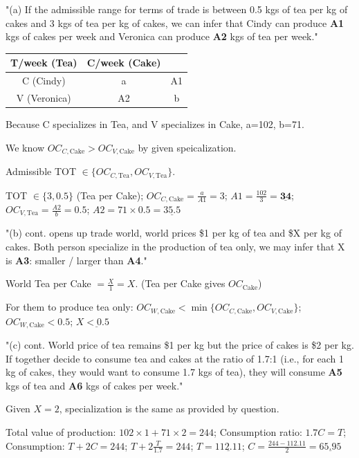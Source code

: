 \documentclass[a4paper]{article}
\begin{document}
\begin{multicols*}{3}
    "(a) If the admissible range for terms of trade is between 0.5 kgs of tea per kg of cakes and 3 kgs of tea per kg of cakes, we can infer that Cindy can produce \textbf{A1} kgs of cakes per week and Veronica can produce \textbf{A2} kgs of tea per week."

    \begin{tabular}{|c|c|c|}
        \hline
        T/week (Tea) & C/week (Cake) &    \\ \hline
        C (Cindy)    & a             & A1 \\ \hline
        V (Veronica) & A2            & b  \\ \hline
    \end{tabular}

    Because C specializes in Tea, and V specializes in Cake, a=102, b=71.

    We know $OC_{C,\text{Cake}} > OC_{V,\text{Cake}}$ by given speicalization.

    Admissible TOT $\in \{OC_{C,\text{Tea}}, OC_{V,\text{Tea}}\}$.

    TOT $\in \{3, 0.5\}$ (Tea per Cake); $OC_{C,\text{Cake}} = \frac{a}{A1} = 3$; $A1 = \frac{102}{3} = \underline{\mathbf{34}}$; $OC_{V,\text{Tea}} = \frac{A2}{b} = 0.5$; $A2 = 71\times0.5 = \underline{\mathbf{35.5}}$

    "(b) cont. opens up trade world, world prices \$1 per kg of tea and \$X per kg of cakes. Both person specialize in the production of tea only, we may infer that X is \textbf{A3}: smaller / larger than \textbf{A4}."

    World Tea per Cake $= \frac{X}{1} = X$. (Tea per Cake gives $OC_\text{Cake}$)

    For them to produce tea only: $OC_{W,\text{Cake}} <\min\{OC_{C,\text{Cake}}, OC_{V,\text{Cake}}\}$; $OC_{W,\text{Cake}} <0.5$; $X \underline{\mathbf{<0.5}}$

    "(c) cont. World price of tea remains \$1 per kg but the price of cakes is \$2 per kg. If together decide to consume tea and cakes at the ratio of 1.7:1 (i.e., for each 1 kg of cakes, they would want to consume 1.7 kgs of tea), they will consume \textbf{A5} kgs of tea and \textbf{A6} kgs of cakes per week."

    Given $X=2$, specialization is the same as provided by question.

    Total value of production: $102 \times 1 + 71 \times 2 = 244$; Consumption ratio: $1.7C = T$; Consumption: $T + 2C = 244$; $T + 2\frac{T}{1.7} = 244$; $T = \underline{\mathbf{112.11}}$; $C = \frac{244-112.11}{2} = \underline{\mathbf{65.95}}$


\end{multicols*}
\end{document}

